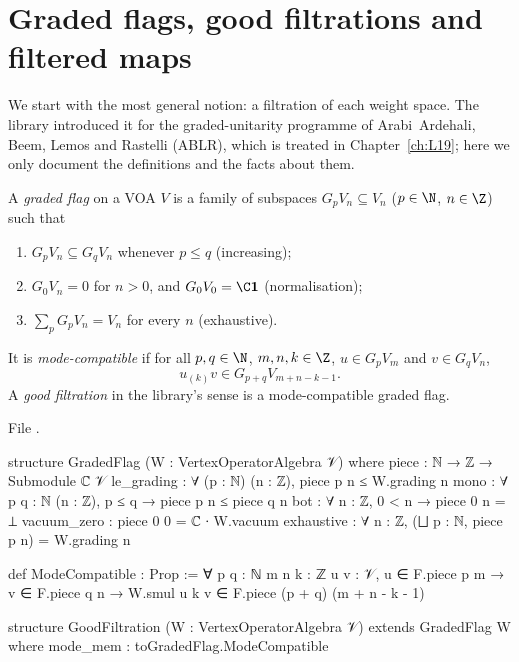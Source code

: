 \section{Graded flags, good filtrations and filtered maps}\label{l11:sec:flags}

We start with the most general notion: a filtration of each weight space. The library introduced it
for the graded-unitarity programme of Arabi~Ardehali, Beem, Lemos and Rastelli (ABLR), which is
treated in Chapter~\ref{ch:L19}; here we only document the definitions and the facts about them.

\begin{definition}\label{l11:def:flag}
A \emph{graded flag} on a VOA $V$ is a family of subspaces $G_pV_n\subseteq V_n$ ($p\in\N$,
$n\in\Z$) such that
\begin{enumerate}
\item $G_pV_n\subseteq G_qV_n$ whenever $p\le q$ (increasing);
\item $G_0V_n = 0$ for $n>0$, and $G_0V_0 = \C\lelevenvac$ (normalisation);
\item $\sum_pG_pV_n = V_n$ for every $n$ (exhaustive).
\end{enumerate}
It is \emph{mode-compatible} if for all $p,q\in\N$, $m,n,k\in\Z$, $u\in G_pV_m$ and $v\in G_qV_n$,
\begin{equation}\label{l11:eq:modecompat}
u_{(k)}v\in G_{p+q}V_{m+n-k-1}.
\end{equation}
A \emph{good filtration} in the library's sense is a mode-compatible graded flag.
\end{definition}
\noindent File .
\begin{leancode}
structure GradedFlag (W : VertexOperatorAlgebra 𝒱) where
  piece : ℕ → ℤ → Submodule ℂ 𝒱
  le_grading : ∀ (p : ℕ) (n : ℤ), piece p n ≤ W.grading n
  mono : ∀ {p q : ℕ} (n : ℤ), p ≤ q → piece p n ≤ piece q n
  bot : ∀ n : ℤ, 0 < n → piece 0 n = ⊥
  vacuum_zero : piece 0 0 = ℂ ∙ W.vacuum
  exhaustive : ∀ n : ℤ, (⨆ p : ℕ, piece p n) = W.grading n

def ModeCompatible : Prop :=
  ∀ {p q : ℕ} {m n k : ℤ} {u v : 𝒱}, u ∈ F.piece p m → v ∈ F.piece q n →
    W.smul u k v ∈ F.piece (p + q) (m + n - k - 1)

structure GoodFiltration (W : VertexOperatorAlgebra 𝒱) extends GradedFlag W where
  mode_mem : toGradedFlag.ModeCompatible
\end{leancode}

